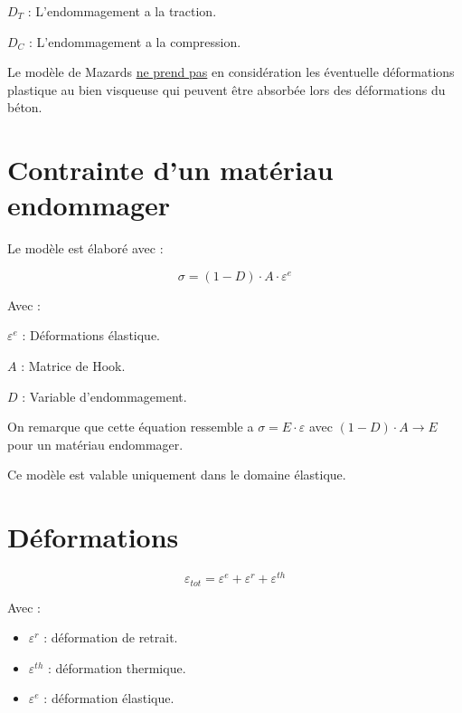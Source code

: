 \documentclass[12pt,a4paper]{report}
\begin{document}
	$D_{T}$ : L'endommagement a la traction.
	
	$D_{C}$ : L'endommagement a la compression.
	
	\vspace{\baselineskip}
	
	Le modèle de Mazards \underline{ne prend pas} en considération les éventuelle déformations plastique au bien visqueuse qui peuvent être absorbée lors des déformations du béton.
	
	\vspace{\baselineskip}
	
	
	\section{Contrainte d'un matériau endommager}
	
	Le modèle est élaboré avec :
	
	\[ \sigma = (1 - D) \cdot A \cdot \varepsilon^{e} \]
	
	
	Avec :
	
	$\varepsilon^{e}$ : Déformations élastique.
	
	$A$ : Matrice de Hook.
	
	$D$ : Variable d'endommagement.
	
	On remarque que cette équation ressemble a $\sigma = E \cdot \varepsilon$ avec $(1 - D) \cdot A \rightarrow E$ pour un matériau endommager.
	
	 
	
	Ce modèle est valable uniquement dans le domaine élastique.
	
	
	\section{Déformations}
	
	
	\begin{samepage}
	

		\[ \varepsilon_{tot} = \varepsilon^{e} + \varepsilon^{r} + \varepsilon^{th} \]
		
		Avec :
		
		\begin{itemize}
			\item $\varepsilon^{r}$ : déformation de retrait.
			\item $\varepsilon^{th}$ : déformation thermique.
			\item $\varepsilon^{e}$ : déformation élastique.
		\end{itemize}
	
	
	\end{samepage}
	
\end{document}
